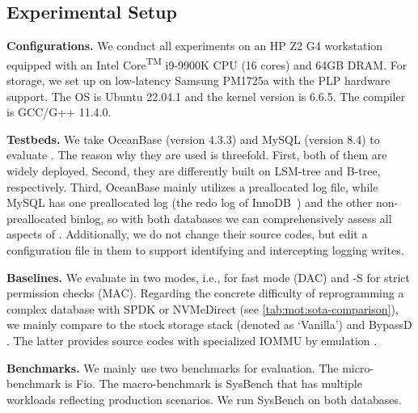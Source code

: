\subsection{Experimental Setup}\label{sec:eval:setup}

{\bf Configurations.} We conduct  all experiments on an HP Z2 G4 workstation equipped with an Intel Core\textsuperscript{TM} i9-9900K CPU (16 cores) and 64GB DRAM. For storage, we set up  \odes on low-latency Samsung PM1725a with the PLP hardware support. 
The OS is Ubuntu 22.04.1 and the kernel version is 6.6.5.
 The  compiler is GCC/G++ 11.4.0.   

{\bf Testbeds.}
We take
OceanBase (version 4.3.3) and  MySQL (version 8.4)
  to evaluate  \odes. The reason why they are used is threefold.
First, both of them are widely deployed.
Second, they are differently built on LSM-tree and B-tree, respectively. 
Third,
OceanBase mainly utilizes a preallocated log file, while MySQL has one preallocated log  (the redo log of InnoDB~\cite{mysql2013mysql})
and the other non-preallocated binlog, so with both databases we can
 comprehensively assess all aspects of \odes.
Additionally, we do not change their source codes, but edit a configuration file in them
to support
 \odes  identifying and intercepting logging writes.

{\bf Baselines.} 
 We   evaluate \odes in two modes, i.e., \odes for fast mode (DAC) and \odes-S for strict permission checks (MAC).
Regarding the  concrete difficulty of reprogramming a complex database with SPDK or NVMeDirect (see \autoref{tab:mot:sota-comparison}),
we mainly  compare \odes to the stock storage  stack (denoted as `Vanilla') and  BypassD \cite{SSD:BypassD:ASPLOS-2024}.
The latter provides source codes with specialized IOMMU by emulation \cite{githubGitHubMultifacetBypassd}.

{\bf Benchmarks.} 
We mainly use two benchmarks for evaluation.
The micro-benchmark is Fio.
The macro-benchmark is SysBench \cite{Sysbench38:online} that
  has multiple workloads reflecting production scenarios.
We run SysBench on both databases.

    

    

